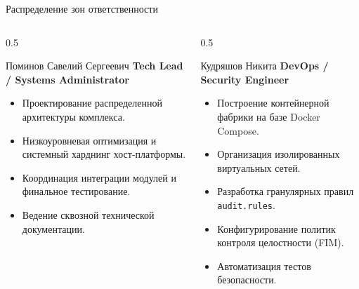 \documentclass[10pt,pdftex,aspectratio=169]{beamer}
\begin{document}
\begin{frame}{Распределение зон ответственности}
    \begin{columns}[t]
        \begin{column}{0.5\textwidth}
            \begin{block}{Поминов Савелий Сергеевич}
                \textbf{Tech Lead / Systems Administrator}
                \begin{itemize}
                    \item Проектирование распределенной архитектуры комплекса.
                    \item Низкоуровневая оптимизация и системный харднинг хост-платформы.
                    \item Координация интеграции модулей и финальное тестирование.
                    \item Ведение сквозной технической документации.
                \end{itemize}
            \end{block}
        \end{column}
        \begin{column}{0.5\textwidth}
            \begin{block}{Кудряшов Никита}
                \textbf{DevOps / Security Engineer}
                \begin{itemize}
                    \item Построение контейнерной фабрики на базе Docker Compose.
                    \item Организация изолированных виртуальных сетей.
                    \item Разработка гранулярных правил \texttt{audit.rules}.
                    \item Конфигурирование политик контроля целостности (FIM).
                    \item Автоматизация тестов безопасности.
                \end{itemize}
            \end{block}
        \end{column}
    \end{columns}
\end{frame}
\end{document}
